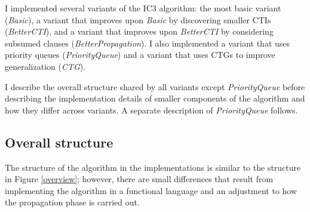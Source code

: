 \documentclass[12pt,a4paper,twoside,openright]{report}
\begin{document}
{{I implemented several variants of the IC3 algorithm:
the most basic variant (\emph{Basic}), a variant that
improves upon \emph{Basic} by discovering smaller CTIs (\emph{BetterCTI}),
and a variant that improves upon \emph{BetterCTI} by considering subsumed clauses
(\emph{BetterPropagation}).
I also implemented a variant that uses priority queues (\emph{PriorityQueue})
and a variant that uses CTGs to improve generalization (\emph{CTG}).

I describe the overall structure shared by all variants except
\emph{PriorityQueue} before describing the implementation
details of smaller components of the algorithm and how they differ across
variants. A separate description of \emph{PriorityQueue}
follows.

\subsection{Overall structure}

The structure of the algorithm in the implementations is similar
to the structure in Figure \ref{overview}; however, there are
small differences that result from implementing the algorithm in a
functional language and an adjustment to how the propagation phase is
carried out.

}}
\end{document}
